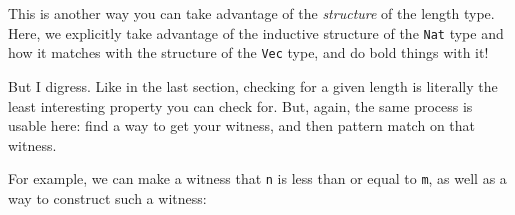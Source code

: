 \documentclass[]{article}
\newenvironment{Shaded}{}{}
\newcommand{\KeywordTok}[1]{\textcolor[rgb]{0.00,0.44,0.13}{\textbf{#1}}}
\newcommand{\DataTypeTok}[1]{\textcolor[rgb]{0.56,0.13,0.00}{#1}}
\newcommand{\CommentTok}[1]{\textcolor[rgb]{0.38,0.63,0.69}{\textit{#1}}}
\newcommand{\OtherTok}[1]{\textcolor[rgb]{0.00,0.44,0.13}{#1}}
\newcommand{\FunctionTok}[1]{\textcolor[rgb]{0.02,0.16,0.49}{#1}}
\newcommand{\NormalTok}[1]{#1}
\begin{document}
\begin{Shaded}
\end{Shaded}

This is another way you can take advantage of the \emph{structure} of the length
type. Here, we explicitly take advantage of the inductive structure of the
\texttt{Nat} type and how it matches with the structure of the \texttt{Vec}
type, and do bold things with it!

But I digress. Like in the last section, checking for a given length is
literally the least interesting property you can check for. But, again, the same
process is usable here: find a way to get your witness, and then pattern match
on that witness.

For example, we can make a witness that \texttt{n} is less than or equal to
\texttt{m}, as well as a way to construct such a witness:
\end{document}
